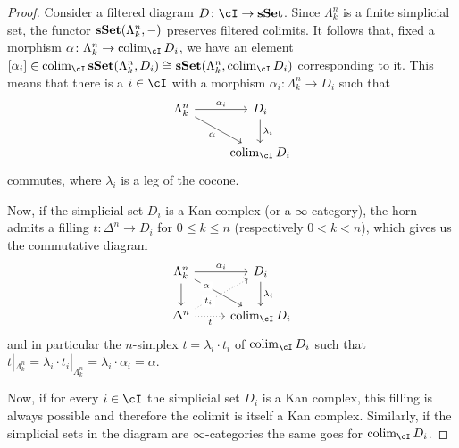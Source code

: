 \documentclass[a4paper,11pt,openany]{scrartcl}
\begin{document}
\begin{proof}
    Consider a filtered diagram $D\colon\cI\rightarrow\sSet$.
    Since $\Lambda^n_k$ is a finite simplicial set, the functor
    $\operatorname{\mathbf{sSet}}(\Lambda^n_k,-)$ preserves
    filtered colimits. It follows that, fixed a morphism
    $\alpha\colon\Lambda^n_k\rightarrow\colim_{\cI}D_i$, we have an element
    $[\alpha_i]\in\colim_{\cI}\sSet(\Lambda^n_k,D_i)\cong\sSet(\Lambda^n_k,\colim_{\cI}D_i)$
    corresponding to it. This means that there is a $i\in\cI$ with a morphism
    $\alpha_i\colon\Lambda^n_k\rightarrow D_i$ such that
    \[\begin{tikzcd}
        {\Lambda^n_k} & {D_i} \\
        {} & {\colim_{\cI}D_i}
        \arrow["{\lambda_i}", from=1-2, to=2-2]
        \arrow["{\alpha_i}", from=1-1, to=1-2]
        \arrow["\alpha"', from=1-1, to=2-2]
    \end{tikzcd}\]
    commutes, where $\lambda_i$ is a leg of the cocone.

    Now, if the simplicial set $D_i$ is a Kan complex (or a
    $\infty$-category), the horn admits a
    filling $t\colon\Delta^n\rightarrow D_i$ for $0\leq k\leq n$ (respectively
    $0<k<n$), which gives us the commutative diagram
    \[\begin{tikzcd}
        {\Lambda^n_k} & {D_i} \\
        {\Delta^n} & {\colim_{\cI}D_i}
        \arrow["{\lambda_i}", from=1-2, to=2-2]
        \arrow["{\alpha_i}", from=1-1, to=1-2]
        \arrow["\alpha"{description, pos=0.25}, from=1-1, to=2-2]
        \arrow["t"', dotted, from=2-1, to=2-2]
        \arrow[from=1-1, to=2-1]
        \arrow["{t_i}"{description, pos=0.25}, dotted, from=2-1, to=1-2]
    \end{tikzcd}\]
    and in particular the $n$-simplex $t=\lambda_i\cdot t_i$ of
    $\colim_{\cI}D_i$ such that $t|_{\Lambda^n_k}=\lambda_i\cdot
    t_i|_{\Lambda^n_k}=\lambda_i\cdot\alpha_i=\alpha$.

    Now, if for every $i\in\cI$ the simplicial set $D_i$ is a Kan complex, this
    filling is always possible and therefore the colimit is itself a Kan
    complex. Similarly, if the simplicial sets in the diagram are
    $\infty$-categories the same goes for $\colim_{\cI}D_i$.
\end{proof}
\end{document}
